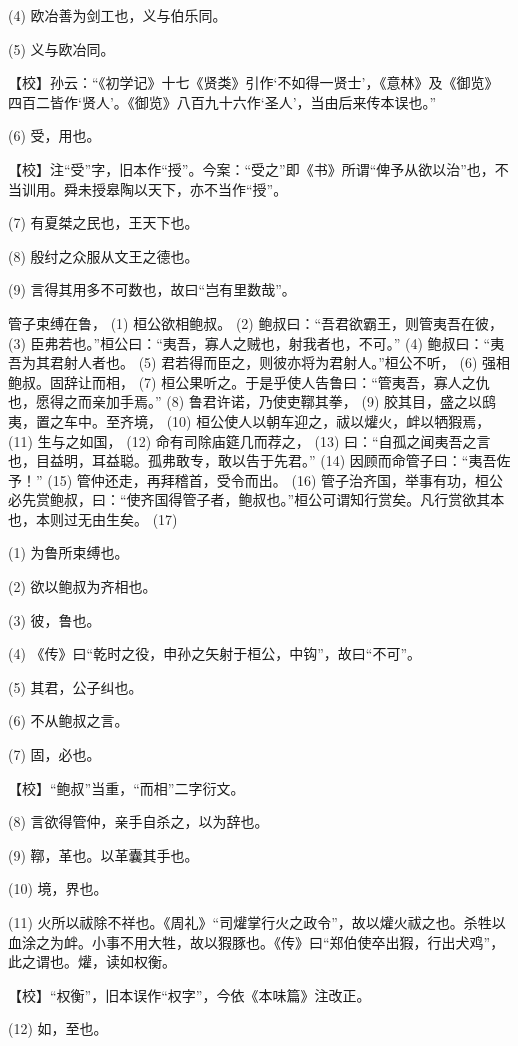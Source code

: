 \documentclass[12pt,UTF8]{ctexbook}
\begin{document}
(4) 欧冶善为剑工也，义与伯乐同。

(5) 义与欧冶同。

【校】孙云：“《初学记》十七《贤类》引作‘不如得一贤士’，《意林》及《御览》四百二皆作‘贤人’。《御览》八百九十六作‘圣人’，当由后来传本误也。”

(6) 受，用也。

【校】注“受”字，旧本作“授”。今案：“受之”即《书》所谓“俾予从欲以治”也，不当训用。舜未授皋陶以天下，亦不当作“授”。

(7) 有夏桀之民也，王天下也。

(8) 殷纣之众服从文王之德也。

(9) 言得其用多不可数也，故曰“岂有里数哉”。

管子束缚在鲁， (1) 桓公欲相鲍叔。 (2) 鲍叔曰：“吾君欲霸王，则管夷吾在彼， (3) 臣弗若也。”桓公曰：“夷吾，寡人之贼也，射我者也，不可。” (4) 鲍叔曰：“夷吾为其君射人者也。 (5) 君若得而臣之，则彼亦将为君射人。”桓公不听， (6) 强相鲍叔。固辞让而相， (7) 桓公果听之。于是乎使人告鲁曰：“管夷吾，寡人之仇也，愿得之而亲加手焉。” (8) 鲁君许诺，乃使吏鞹其拳， (9) 胶其目，盛之以鸱夷，置之车中。至齐境， (10) 桓公使人以朝车迎之，祓以爟火，衅以牺猳焉， (11) 生与之如国， (12) 命有司除庙筵几而荐之， (13) 曰：“自孤之闻夷吾之言也，目益明，耳益聪。孤弗敢专，敢以告于先君。” (14) 因顾而命管子曰：“夷吾佐予！” (15) 管仲还走，再拜稽首，受令而出。 (16) 管子治齐国，举事有功，桓公必先赏鲍叔，曰：“使齐国得管子者，鲍叔也。”桓公可谓知行赏矣。凡行赏欲其本也，本则过无由生矣。 (17)

(1) 为鲁所束缚也。

(2) 欲以鲍叔为齐相也。

(3) 彼，鲁也。

(4) 《传》曰“乾时之役，申孙之矢射于桓公，中钩”，故曰“不可”。

(5) 其君，公子纠也。

(6) 不从鲍叔之言。

(7) 固，必也。

【校】“鲍叔”当重，“而相”二字衍文。

(8) 言欲得管仲，亲手自杀之，以为辞也。

(9) 鞹，革也。以革囊其手也。

(10) 境，界也。

(11) 火所以祓除不祥也。《周礼》“司爟掌行火之政令”，故以爟火祓之也。杀牲以血涂之为衅。小事不用大牲，故以猳豚也。《传》曰“郑伯使卒出猳，行出犬鸡”，此之谓也。爟，读如权衡。

【校】“权衡”，旧本误作“权字”，今依《本味篇》注改正。

(12) 如，至也。
\end{document}
